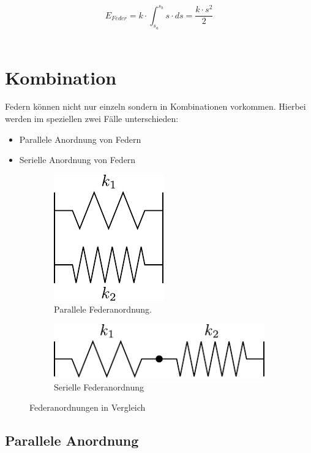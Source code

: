 \[ \boxed{E_{Feder} = k \cdot \int_{s_a}^{s_b} s \cdot ds = \frac{k \cdot s^2}{2}} \] \\

\section{Kombination}
Federn können nicht nur einzeln sondern in Kombinationen vorkommen. Hierbei
werden im speziellen zwei Fälle unterschieden:

\begin{itemize}
	\item Parallele Anordnung von Federn
	\item Serielle Anordnung von Federn
\end{itemize}

\begin{figure}[h!]
	\centering
	\begin{subfigure}[c]{0.45\textwidth}
		\includegraphics[scale=0.75]{feder-parallel.pdf}
		\caption{Parallele Federanordnung.}
		\label{fig:feder-parallel}
	\end{subfigure}
	\begin{subfigure}[c]{0.45\textwidth}
		\includegraphics[scale=0.75]{feder-seriell.pdf}
		\caption{Serielle Federanordnung}
		\label{fig:feder-seriell}
	\end{subfigure}
	\caption{Federanordnungen in Vergleich}
	\label{fig:federanordnungen}
\end{figure}

\subsection{Parallele Anordnung}

